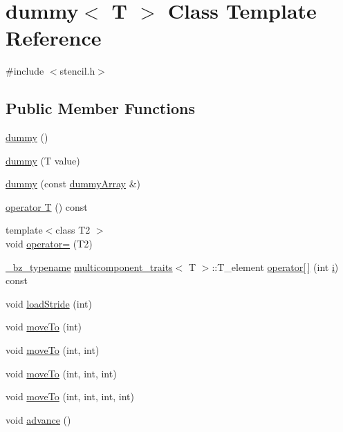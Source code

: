 \hypertarget{classdummy}{}\section{dummy$<$ T $>$ Class Template Reference}
\label{classdummy}


{\ttfamily \#include $<$stencil.\+h$>$}

\subsection*{Public Member Functions}
\begin{DoxyCompactItemize}
\item 
\hyperlink{classdummy_a2b0dbbc44e440c8ad74ef619595e05a2}{dummy} ()
\item 
\hyperlink{classdummy_acfe0966442eb399d315cd5fe4aa5207c}{dummy} (T value)
\item 
\hyperlink{classdummy_a2a414b7485757fe617e437d7e2fd5191}{dummy} (const \hyperlink{structdummyArray}{dummy\+Array} \&)
\item 
\hyperlink{classdummy_a8d1639f6484c4cff620264cd5c163dd1}{operator T} () const 
\item 
{\footnotesize template$<$class T2 $>$ }\\void \hyperlink{classdummy_a5a88fb299167497769c21cd4fc53c42e}{operator=} (T2)
\item 
\hyperlink{compiler_8h_a1bc40add3e72effc9cf69dbe445cbdfd}{\+\_\+bz\+\_\+typename} \hyperlink{structmulticomponent__traits}{multicomponent\+\_\+traits}$<$ T $>$\+::T\+\_\+element \hyperlink{classdummy_abc0e24c0a0655b3563100338a953da80}{operator\mbox{[}$\,$\mbox{]}} (int \hyperlink{indexexpr_8h_aabd77643995707c185e95c8cb2782c81}{i}) const 
\item 
void \hyperlink{classdummy_a17cfcbbe5fbf7c0e0e6456bcd07003ee}{load\+Stride} (int)
\item 
void \hyperlink{classdummy_a52c5a6fdecb5c26095abb80fa8f5f3c2}{move\+To} (int)
\item 
void \hyperlink{classdummy_a89f42dcfaa3e0d7a879f93c8ccdabc15}{move\+To} (int, int)
\item 
void \hyperlink{classdummy_abaf8ccef17dcef65bc24be517c73aa92}{move\+To} (int, int, int)
\item 
void \hyperlink{classdummy_abb9078ad87ef4944816a91c9e79dc2d5}{move\+To} (int, int, int, int)
\item 
void \hyperlink{classdummy_a5621c0e9fa55af2a5816bad400ed4d89}{advance} ()
\item 

\end{DoxyCompactItemize}
